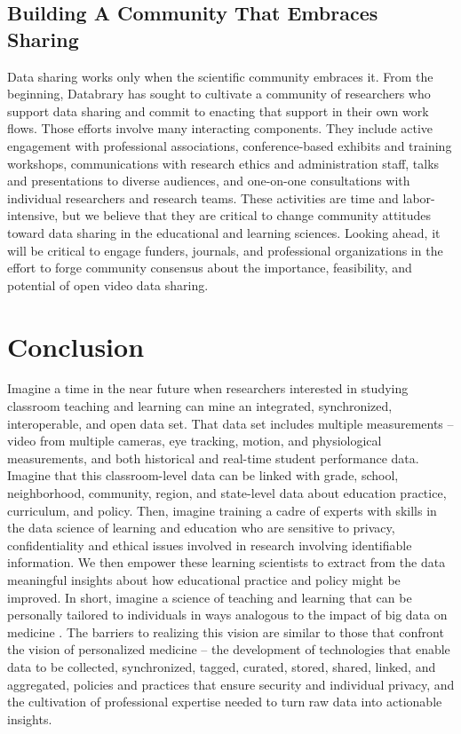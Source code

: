 \documentclass[letterpaper,man,apacite]{apa6}
\begin{document}
\subsection{Building A Community That Embraces Sharing}

Data sharing works only when the scientific community embraces it.
From the beginning, Databrary has sought to cultivate a community of researchers who support data sharing and commit to enacting that support in their own work flows.
Those efforts involve many interacting components.
They include active engagement with professional associations, conference-based exhibits and training workshops, communications with research ethics and administration staff, talks and presentations to diverse audiences, and one-on-one consultations with individual researchers and research teams.
These activities are time and labor-intensive, but we believe that they are critical to change community attitudes toward data sharing in the educational and learning sciences.
Looking ahead, it will be critical to engage funders, journals, and professional organizations in the effort to forge community consensus about the importance, feasibility, and potential of open video data sharing.

\section{Conclusion}

Imagine a time in the near future when researchers interested in studying classroom teaching and learning can mine an integrated, synchronized, interoperable, and open data set.
That data set includes multiple measurements -- video from multiple cameras, eye tracking, motion, and physiological measurements, and both historical and real-time student performance data.
Imagine that this classroom-level data can be linked with grade, school, neighborhood, community, region, and state-level data about education practice, curriculum, and policy.
Then, imagine training a cadre of experts with skills in the data science of learning and education who are sensitive to privacy, confidentiality and ethical issues involved in research involving identifiable information.
We then empower these learning scientists to extract from the data meaningful insights about how educational practice and policy might be improved.
In short, imagine a science of teaching and learning that can be personally tailored to individuals in ways analogous to the impact of big data on medicine \cite{BBC2014}.
The barriers to realizing this vision are similar to those that confront the vision of personalized medicine -- the development of technologies that enable data to be collected, synchronized, tagged, curated, stored, shared, linked, and aggregated, policies and practices that ensure security and individual privacy, and the cultivation of professional expertise needed to turn raw data into actionable insights.
\end{document}
